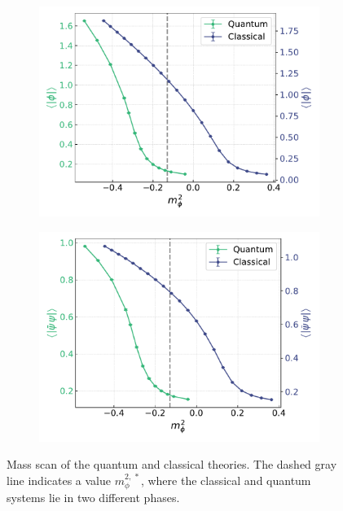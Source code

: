 \begin{figure}[h]
    \centering
    \captionsetup[subfigure]{justification=centering}
    \begin{subfigure}[t]{0.48\textwidth}
        \centering
        \includegraphics[width=1.05\textwidth]{figures/chiral_PT/mass_scan/magnetisation.pdf}
    \end{subfigure}
    \hfill
    \begin{subfigure}[t]{0.48\textwidth}
        \centering
        \includegraphics[width=1.05\textwidth]{figures/chiral_PT/mass_scan/condensate.pdf}
    \end{subfigure}
    \caption[Mass scan of the quantum and classical theories]{Mass scan of the quantum and classical theories. The dashed gray line indicates a value $m_\phi^{2, \,*}$, where the classical and quantum systems lie in two different phases.}
    \label{fig:scans_classical_quantum}
\end{figure} 
